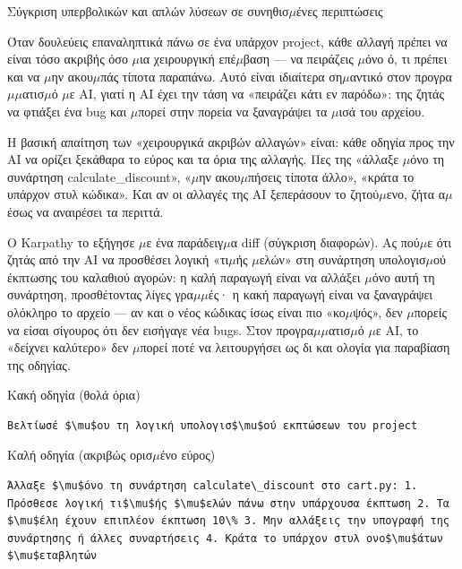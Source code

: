 \begin{center}\small\color{gray}Σύγκριση υπερβολικών και απλών λύσεων σε συνηθισ$\mu$ένες περιπτώσεις\end{center}


Όταν δουλεύεις επαναληπτικά πάνω σε ένα υπάρχον project, κάθε αλλαγή πρέπει να είναι τόσο ακριβής όσο $\mu$ια χειρουργική επέ$\mu$βαση — να πειράζεις $\mu$όνο ό, τι πρέπει και να $\mu$ην ακου$\mu$πάς τίποτα παραπάνω. Αυτό είναι ιδιαίτερα ση$\mu$αντικό στον προγρα$\mu$$\mu$ατισ$\mu$ό $\mu$ε AI, γιατί η AI έχει την τάση να «πειράζει κάτι εν παρόδω»: της ζητάς να φτιάξει ένα bug και $\mu$πορεί στην πορεία να ξαναγράψει τα $\mu$ισά του αρχείου.

Η βασική απαίτηση των «χειρουργικά ακριβών αλλαγών» είναι: κάθε οδηγία προς την AI να ορίζει ξεκάθαρα το εύρος και τα όρια της αλλαγής. Πες της «άλλαξε $\mu$όνο τη συνάρτηση calculate\_discount», «$\mu$ην ακου$\mu$πήσεις τίποτα άλλο», «κράτα το υπάρχον στυλ κώδικα». Και αν οι αλλαγές της AI ξεπεράσουν το ζητού$\mu$ενο, ζήτα α$\mu$έσως να αναιρέσει τα περιττά.

Ο Karpathy το εξήγησε $\mu$ε ένα παράδειγ$\mu$α diff (σύγκριση διαφορών). Ας πού$\mu$ε ότι ζητάς από την AI να προσθέσει λογική «τι$\mu$ής $\mu$ελών» στη συνάρτηση υπολογισ$\mu$ού έκπτωσης του καλαθιού αγορών: η καλή παραγωγή είναι να αλλάξει $\mu$όνο αυτή τη συνάρτηση, προσθέτοντας λίγες γρα$\mu$$\mu$ές· η κακή παραγωγή είναι να ξαναγράψει ολόκληρο το αρχείο — αν και ο νέος κώδικας ίσως είναι πιο «κο$\mu$ψός», δεν $\mu$πορείς να είσαι σίγουρος ότι δεν εισήγαγε νέα bugs. Στον προγρα$\mu$$\mu$ατισ$\mu$ό $\mu$ε AI, το «δείχνει καλύτερο» δεν $\mu$πορεί ποτέ να λειτουργήσει ως δι και ολογία για παραβίαση της οδηγίας.

Κακή οδηγία (θολά όρια)

\begin{lstlisting}
Βελτίωσέ $\mu$ου τη λογική υπολογισ$\mu$ού εκπτώσεων του project
\end{lstlisting}

Καλή οδηγία (ακριβώς ορισ$\mu$ένο εύρος)

\begin{lstlisting}
Άλλαξε $\mu$όνο τη συνάρτηση calculate\_discount στο cart.py: 1. Πρόσθεσε λογική τι$\mu$ής $\mu$ελών πάνω στην υπάρχουσα έκπτωση 2. Τα $\mu$έλη έχουν επιπλέον έκπτωση 10\% 3. Μην αλλάξεις την υπογραφή της συνάρτησης ή άλλες συναρτήσεις 4. Κράτα το υπάρχον στυλ ονο$\mu$άτων $\mu$εταβλητών
\end{lstlisting}

